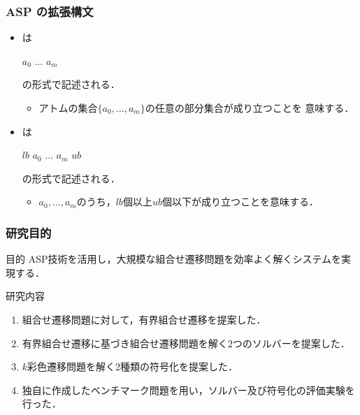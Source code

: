 \documentclass[dvipdfmx,11pt]{beamer}
\begin{document}
\begin{frame}\frametitle{ASP の拡張構文}

  \begin{itemize}
    \item {}は
          \begin{center}
            \code{\{} $a_0$ \code{;} $\dots$ \code{;} $a_{m}$ \code{\}}
          \end{center}
          の形式で記述される．
          \begin{itemize}
            \item アトムの集合$\{ a_0, \dots, a_m\}$の任意の部分集合が成り立つことを
                  意味する．
          \end{itemize}
    \item {}は
          \begin{center}
            $lb$ \code{\{} $a_0$ \code{;} $\dots$ \code{;} $a_{m}$ \code{\}} $ub$
          \end{center}
          の形式で記述される．
          \begin{itemize}
            \item $a_0, \dots, a_m$のうち，$lb$個以上$ub$個以下が成り立つことを意味する．
          \end{itemize}
  \end{itemize}
  
\end{frame}

\begin{frame}\frametitle{研究目的}

  \begin{alertblock}{目的}
    ASP技術を活用し，大規模な組合せ遷移問題を効率よく解くシステムを実現する．
  \end{alertblock}

  \begin{block}{研究内容}
    \begin{enumerate}
    \item 組合せ遷移問題に対して，有界組合せ遷移を提案した．
    \item 有界組合せ遷移に基づき組合せ遷移問題を解く2つのソルバーを提案した．
    \item $k$彩色遷移問題を解く2種類の符号化を提案した．
    \item 独自に作成したベンチマーク問題を用い，ソルバー及び符号化の評価実験を行った．
    \end{enumerate}
  \end{block}

\end{frame}
\end{document}
